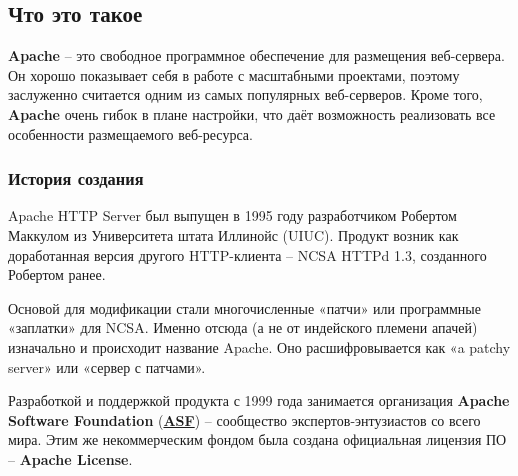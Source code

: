 \documentclass[14pt, a4paper]{article}
\begin{document}
\subsection*{Что это такое}

\textbf{Apache} – это свободное программное обеспечение для размещения веб-сервера. Он хорошо показывает 
себя в работе с масштабными проектами, поэтому заслуженно считается одним из самых популярных 
веб-серверов. Кроме того, \textbf{Apache} очень гибок в плане настройки, что даёт возможность реализовать 
все особенности размещаемого веб-ресурса.

\subsubsection*{История создания}
Apache HTTP Server был выпущен в 1995 году разработчиком Робертом Маккулом из Университета штата 
Иллинойс (UIUC). Продукт возник как доработанная версия другого HTTP-клиента – NCSA HTTPd 1.3, 
созданного Робертом ранее.

Основой для модификации стали многочисленные «патчи» или программные «заплатки» для NCSA. 
Именно отсюда (а не от индейского племени апачей) изначально и происходит название Apache.
Оно расшифровывается как «a patchy server» или «сервер с патчами».

\begin{figure}[h]%
    \centering
    \label{1.0}
\end{figure}

Разработкой и поддержкой продукта с 1999 года занимается организация \textbf{Apache Software Foundation} 
(\textbf{\uline{ASF}}) – сообщество экспертов-энтузиастов со всего мира. Этим же некоммерческим фондом была 
создана официальная лицензия ПО – \textbf{Apache License}.
\end{document}
